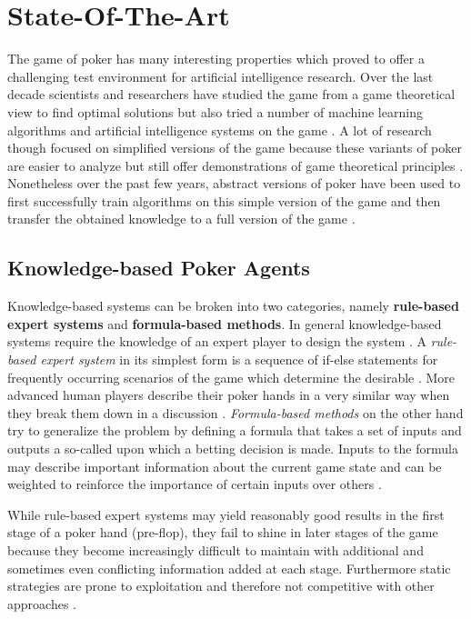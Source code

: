 

\chapter{State-Of-The-Art}
\label{cha:State-Of-The-Art}
The game of poker has many interesting properties which proved to offer a challenging test environment for artificial intelligence research. Over the last decade scientists and researchers have studied the game from a game theoretical view to find optimal solutions but also tried a number of machine learning algorithms and artificial intelligence systems on the game \cite{opp_master, challenge_of_poker}. A lot of research though focused on simplified versions of the game because these variants of poker are easier to analyze but still offer demonstrations of game theoretical principles \cite{challenge_of_poker}. Nonetheless over the past few years, abstract versions of poker have been used to first successfully train algorithms on this simple version of the game and then transfer the obtained knowledge to a full version of the game \cite{opp_master, challenge_of_poker}.
\section{Knowledge-based Poker Agents}
Knowledge-based systems can be broken into two categories, namely \textbf{rule-based expert systems} and \textbf{formula-based methods}. In general knowledge-based systems require the knowledge of an expert player to design the system \cite{review}. A \textit{rule-based expert system} in its simplest form is a sequence of if-else statements for frequently occurring scenarios of the game which determine the desirable . More advanced human players describe their poker hands in a very similar way when they break them down in a discussion \cite{master_nuno}. \textit{Formula-based methods} on the other hand try to generalize the problem by defining a formula that takes a set of inputs and outputs a so-called  upon which a betting decision is made. Inputs to the formula may describe important information about the current game state and can be weighted to reinforce the importance of certain inputs over others \cite{review}. \par
While rule-based expert systems may yield reasonably good results in the first stage of a poker hand (pre-flop), they fail to shine in later stages of the game because they become increasingly difficult to maintain with additional and sometimes even conflicting information added at each stage. Furthermore  static strategies are prone to exploitation and therefore not competitive with other approaches \cite{review}.
